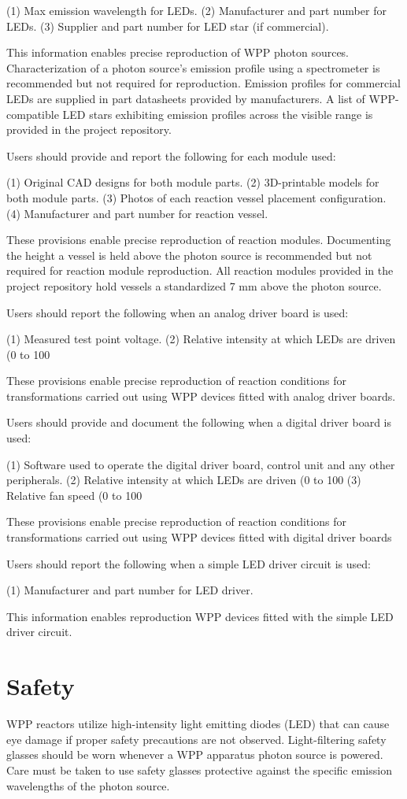 \documentclass[11pt]{article}
\let\stdsection\section
\renewcommand\section{\clearpage\stdsection}
\begin{document}
    (1) Max emission wavelength for LEDs.
    (2) Manufacturer and part number for LEDs.
    (3) Supplier and part number for LED star (if commercial).

This information enables precise reproduction of WPP photon sources. Characterization of a photon source’s emission profile using a spectrometer is recommended but not required for reproduction. Emission profiles for commercial LEDs are supplied in part datasheets provided by manufacturers. A list of WPP-compatible LED stars exhibiting emission profiles across the visible range is provided in the project repository.

Users should provide and report the following for each module used:

    (1) Original CAD designs for both module parts.
    (2) 3D-printable models for both module parts.
    (3) Photos of each reaction vessel placement configuration.
    (4) Manufacturer and part number for reaction vessel.

These provisions enable precise reproduction of reaction modules. Documenting the height a vessel is held above the photon source is recommended but not required for reaction module reproduction. All reaction modules provided in the project repository hold vessels a standardized 7 mm above the photon source.

Users should report the following when an analog driver board is used:

    (1) Measured test point voltage.
    (2) Relative intensity at which LEDs are driven (0 to 100%

These provisions enable precise reproduction of reaction conditions for transformations carried out using WPP devices fitted with analog driver boards.

Users should provide and document the following when a digital driver board is used:

    (1) Software used to operate the digital driver board, control unit and any other peripherals.
    (2) Relative intensity at which LEDs are driven (0 to 100%
    (3) Relative fan speed (0 to 100%

These provisions enable precise reproduction of reaction conditions for transformations carried out using WPP devices fitted with digital driver boards

Users should report the following when a simple LED driver circuit is used:

    (1) Manufacturer and part number for LED driver.

This information enables reproduction WPP devices fitted with the simple LED driver circuit.

\section{Safety}

WPP reactors utilize high-intensity light emitting diodes (LED) that can cause eye damage if proper safety precautions are not observed.
Light-filtering safety glasses should be worn whenever a WPP apparatus photon source is powered.
Care must be taken to use safety glasses protective against the specific emission wavelengths of the photon source.
\end{document}
